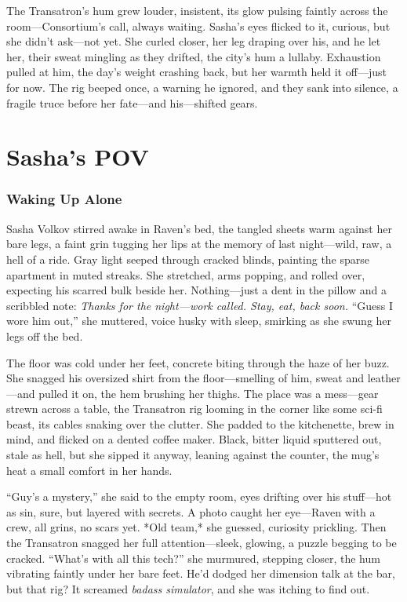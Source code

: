 \documentclass[12pt]{book}
\begin{document}
The Transatron’s hum grew louder, insistent, its glow pulsing faintly across the room—Consortium’s call, always waiting. Sasha’s eyes flicked to it, curious, but she didn’t ask—not yet. She curled closer, her leg draping over his, and he let her, their sweat mingling as they drifted, the city’s hum a lullaby. Exhaustion pulled at him, the day’s weight crashing back, but her warmth held it off—just for now. The rig beeped once, a warning he ignored, and they sank into silence, a fragile truce before her fate—and his—shifted gears.

\chapter{Sasha’s POV}

\subsection{Waking Up Alone}

Sasha Volkov stirred awake in Raven’s bed, the tangled sheets warm against her bare legs, a faint grin tugging her lips at the memory of last night—wild, raw, a hell of a ride. Gray light seeped through cracked blinds, painting the sparse apartment in muted streaks. She stretched, arms popping, and rolled over, expecting his scarred bulk beside her. Nothing—just a dent in the pillow and a scribbled note: \textit{Thanks for the night—work called. Stay, eat, back soon.} “Guess I wore him out,” she muttered, voice husky with sleep, smirking as she swung her legs off the bed.

The floor was cold under her feet, concrete biting through the haze of her buzz. She snagged his oversized shirt from the floor—smelling of him, sweat and leather—and pulled it on, the hem brushing her thighs. The place was a mess—gear strewn across a table, the Transatron rig looming in the corner like some sci-fi beast, its cables snaking over the clutter. She padded to the kitchenette, brew in mind, and flicked on a dented coffee maker. Black, bitter liquid sputtered out, stale as hell, but she sipped it anyway, leaning against the counter, the mug’s heat a small comfort in her hands.

“Guy’s a mystery,” she said to the empty room, eyes drifting over his stuff—hot as sin, sure, but layered with secrets. A photo caught her eye—Raven with a crew, all grins, no scars yet. *Old team,* she guessed, curiosity prickling. Then the Transatron snagged her full attention—sleek, glowing, a puzzle begging to be cracked. “What’s with all this tech?” she murmured, stepping closer, the hum vibrating faintly under her bare feet. He’d dodged her dimension talk at the bar, but that rig? It screamed \textit{badass simulator}, and she was itching to find out.
\end{document}
